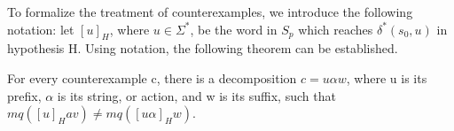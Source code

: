 To formalize the treatment of counterexamples, we introduce the following notation: let $[u]_H$, where $u\in\Sigma^*$, be the word  in $S_p$ which reaches $\delta^*(s_0, u)$ in hypothesis H. Using notation, the following theorem can be established.

\begin{theorem}
	For every counterexample c, there is a decomposition $c=u\alpha w$, where u is its prefix, $\alpha$ is its string, or action, and w is its suffix, such that $mq([u]_Hav)\neq mq([u\alpha]_Hw)$.
\end{theorem}